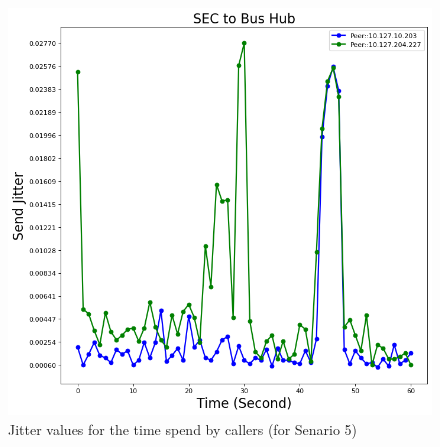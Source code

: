 	\begin{figure}[tbh]
		\begin{minipage}{\textwidth}
			\includegraphics[scale=0.38]{Images/experiment/senarios/df_bus_hub.png}
		\end{minipage}
		\caption{Jitter values for the time spend by callers (for Senario 5)}
		\label{fig:scene-out-5}
	\end{figure}